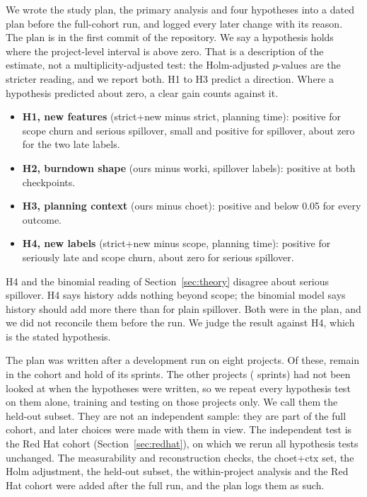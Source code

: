 \documentclass[journal]{IEEEtran}
\begin{document}
We wrote the study plan, the primary analysis and four hypotheses into a dated plan before the full-cohort run, and logged every later change with its reason. The plan is in the first commit of the repository. We say a hypothesis holds where the project-level interval is above zero. That is a description of the estimate, not a multiplicity-adjusted test: the Holm-adjusted $p$-values are the stricter reading, and we report both. H1 to H3 predict a direction. Where a hypothesis predicted about zero, a clear gain counts against it.
\begin{itemize}
\item \textbf{H1, new features} (strict+new minus strict, planning time): positive for scope churn and serious spillover, small and positive for spillover, about zero for the two late labels.
\item \textbf{H2, burndown shape} (ours minus worki, spillover labels): positive at both checkpoints.
\item \textbf{H3, planning context} (ours minus choet): positive and below 0.05 for every outcome.
\item \textbf{H4, new labels} (strict+new minus scope, planning time): positive for seriously late and scope churn, about zero for serious spillover.
\end{itemize}
H4 and the binomial reading of Section~\ref{sec:theory} disagree about serious spillover. H4 says history adds nothing beyond scope; the binomial model says history should add more there than for plain spillover. Both were in the plan, and we did not reconcile them before the run. We judge the result against H4, which is the stated hypothesis.

The plan was written after a development run on eight projects. Of these, \DevProj{} remain in the cohort and hold \DevSprints{} of its sprints. The other \ConfProj{} projects (\ConfSprints{} sprints) had not been looked at when the hypotheses were written, so we repeat every hypothesis test on them alone, training and testing on those projects only. We call them the held-out subset. They are not an independent sample: they are part of the full cohort, and later choices were made with them in view. The independent test is the Red Hat cohort (Section~\ref{sec:redhat}), on which we rerun all hypothesis tests unchanged. The measurability and reconstruction checks, the choet+ctx set, the Holm adjustment, the held-out subset, the within-project analysis and the Red Hat cohort were added after the full run, and the plan logs them as such.
\end{document}
